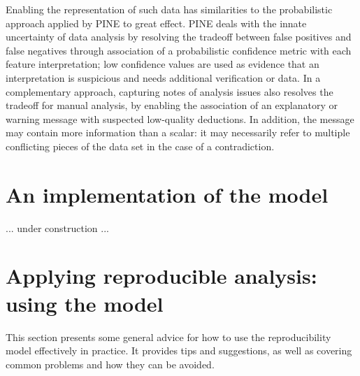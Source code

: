 Enabling the representation of such data has similarities to the probabilistic
approach applied by PINE \cite{pine} to great effect.  
PINE deals with the innate uncertainty of data 
analysis by resolving the tradeoff between false positives and false 
negatives through association of a probabilistic confidence metric with each
feature interpretation; low confidence values are used as evidence that an
interpretation is suspicious and needs additional verification or data.
In a complementary approach, capturing notes of analysis issues also 
resolves the tradeoff for manual analysis, by enabling the association of
an explanatory or warning message with suspected low-quality deductions.
In addition, the message may contain more information than a scalar: it may
necessarily refer to multiple conflicting pieces of the data set in the case
of a contradiction.



\section{An implementation of the model}
... under construction ...



\section{Applying reproducible analysis: using the model}
This section presents some general advice for how to use the reproducibility
model effectively in practice.  It provides tips and suggestions, as well
as covering common problems and how they can be avoided.

